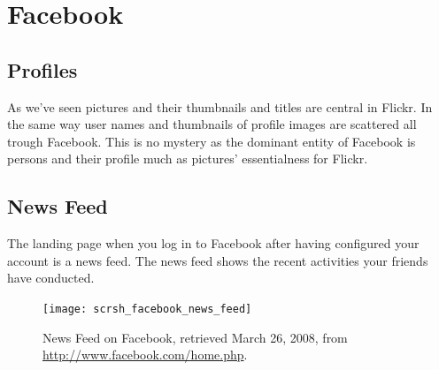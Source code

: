 \section{Facebook}
\label{section:analysis.facebook}

\subsection{Profiles}

As we've seen pictures and their thumbnails and titles are central in Flickr.
In the same way user names and thumbnails of profile images are scattered all
trough Facebook. This is no mystery as the dominant entity of Facebook is
persons and their profile much as pictures' essentialness for Flickr.

\subsection{News Feed}

The landing page when you log in to Facebook after having configured your
account is a news feed. The news feed shows the recent activities your friends
have conducted.

\begin{figure}
  \texttt{[image: scrsh\_facebook\_news\_feed]}
  \caption[Facebook News Feed]{%
     News Feed on Facebook,
     retrieved March 26, 2008, from \url{http://www.facebook.com/home.php}.}
  \label{figure:scrsh.facebook.news.feed}
\end{figure}



